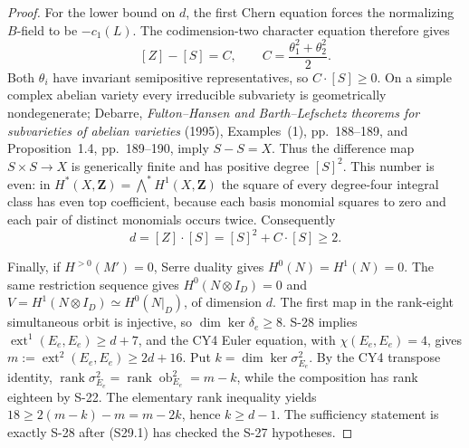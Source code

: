 \begin{proof}
For the lower bound on $d$, the first Chern equation
forces the normalizing $B$-field to be $-c_1(L)$.
The codimension-two character equation therefore gives
\[
 [Z]-[S]=C,\qquad C=\frac{\theta_1^2+\theta_2^2}{2}.
 \tag{S29.6}
\]
Both $\theta_i$ have invariant semipositive representatives,
so $C\cdot[S]\ge0$. On a simple complex abelian variety
every irreducible subvariety is geometrically nondegenerate;
Debarre, \emph{Fulton--Hansen and Barth--Lefschetz theorems
for subvarieties of abelian varieties} (1995),
Examples~(1), pp.~188--189, and Proposition~1.4,
pp.~189--190, imply $S-S=X$.
Thus the difference map $S\times S\to X$ is generically
finite and has positive degree $[S]^2$.
This number is even: in
$H^*(X,\mathbf Z)=\bigwedge^*H^1(X,\mathbf Z)$ the square
of every degree-four integral class has even top
coefficient, because each basis monomial squares to zero
and each pair of distinct monomials occurs twice.
Consequently
\[
 d=[Z]\cdot[S]=[S]^2+C\cdot[S]\ge2.
 \tag{S29.7}
\]

Finally, if $H^{>0}(M')=0$, Serre duality gives
$H^0(N)=H^1(N)=0$. The same restriction sequence gives
$H^0(N\otimes I_D)=0$ and
$V=H^1(N\otimes I_D)\simeq H^0(N|_D)$, of dimension $d$.
The first map in the rank-eight simultaneous orbit is
injective, so $\dim\ker\delta_e\ge8$.
S-28 implies $\operatorname{ext}^1(E_e,E_e)\ge d+7$,
and the CY4 Euler equation, with $\chi(E_e,E_e)=4$,
gives $m:=\operatorname{ext}^2(E_e,E_e)\ge2d+16$.
Put $k=\dim\ker\sigma^2_{E_e}$.
By the CY4 transpose identity,
$\operatorname{rank}\sigma^2_{E_e}
 =\operatorname{rank}\operatorname{ob}^2_{E_e}=m-k$,
while the composition has rank eighteen by S-22.
The elementary rank inequality yields
$18\ge2(m-k)-m=m-2k$, hence $k\ge d-1$.
The sufficiency statement is exactly S-28 after (S29.1)
has checked the S-27 hypotheses.
\end{proof}

